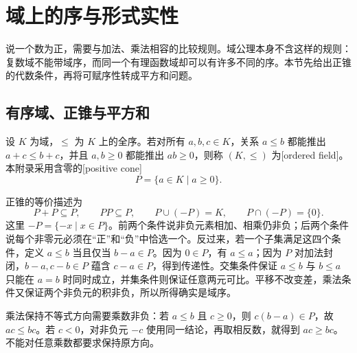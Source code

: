 
\section{域上的序与形式实性}
\label{b1:sec:E01}

说一个数为正，需要与加法、乘法相容的比较规则。域公理本身不含这样的规则：复数域不能带域序，而同一个有理函数域却可以有许多不同的序。本节先给出正锥的代数条件，再将可赋序性转成平方和问题。

%
%

\subsection{有序域、正锥与平方和}
\label{b1:subsec:E01:01}

\begin{definition}\label{b1:def:ordered-field}
	设 \(K\) 为域，\(\leq\) 为 \(K\) 上的全序。若对所有 \(a,b,c\in K\)，关系 \(a\leq b\) 都能推出 \(a+c\leq b+c\)，并且 \(a,b\geq0\) 都能推出 \(ab\geq0\)，则称 \((K,\leq)\) 为[ordered field]。本附录采用含零的[positive cone]
	\[
		P=\{a\in K\mid a\geq0\}.
	\]
\end{definition}

正锥的等价描述为
\[
	P+P\subseteq P,\qquad PP\subseteq P,\qquad P\cup(-P)=K,\qquad P\cap(-P)=\{0\}.
\]
这里 \(-P=\{-x\mid x\in P\}\)。前两个条件说非负元素相加、相乘仍非负；后两个条件说每个非零元必须在“正”和“负”中恰选一个。反过来，若一个子集满足这四个条件，定义 \(a\leq b\) 当且仅当 \(b-a\in P\)。因为 \(0\in P\)，有 \(a\leq a\)；因为 \(P\) 对加法封闭，\(b-a,c-b\in P\) 蕴含 \(c-a\in P\)，得到传递性。交集条件保证 \(a\leq b\) 与 \(b\leq a\) 只能在 \(a=b\) 时同时成立，并集条件则保证任意两元可比。平移不改变差，乘法条件又保证两个非负元的积非负，所以所得确实是域序。

\ProseParagraphBreak
乘法保持不等式方向需要乘数非负：若 \(a\leq b\) 且 \(c\geq0\)，则 \(c(b-a)\in P\)，故 \(ac\leq bc\)。若 \(c<0\)，对非负元 \(-c\) 使用同一结论，再取相反数，就得到 \(ac\geq bc\)。不能对任意乘数都要求保持原方向。

